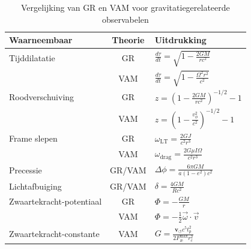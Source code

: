 \begin{table}[ht]
    \centering
    \caption{Vergelijking van GR en VAM voor gravitatiegerelateerde observabelen}
    \label{tab:VAM-GR}
    \begin{tabular}{|l|c|l|}
        \hline
        \textbf{Waarneembaar} & \textbf{Theorie} & \textbf{Uitdrukking} \\
        \hline
        Tijddilatatie & GR & $  \frac{d\tau}{dt} = \sqrt{1 - \frac{2GM}{rc^2}} $ \\
        & VAM & $  \frac{d\tau}{dt} = \sqrt{1 - \frac{\Omega^2 r^2}{c^2}} $ \\
        \hline
        Roodverschuiving & GR & $  z = \left(1 - \frac{2GM}{rc^2} \right)^{-1/2} - 1 $ \\
        & VAM & $  z = \left(1 - \frac{v_\phi^2}{c^2} \right)^{-1/2} - 1 $ \\
        \hline
        Frame slepen & GR & $  \omega_\text{LT} = \frac{2GJ}{c^2 r^3} $ \\
        & VAM & $  \omega_\text{drag} = \frac{2G \mu I \Omega}{c^2 r^3} $ \\
        \hline
        Precessie & GR/VAM & $  \Delta\phi = \frac{6\pi GM}{a(1 - e^2)c^2} $ \\
        \hline
        Lichtafbuiging & GR/VAM & $  \delta = \frac{4GM}{Rc^2} $ \\
        \hline
        Zwaartekracht-potentiaal & GR & $  \Phi = -\frac{GM}{r} $ \\
        & VAM & $  \Phi = -\frac{1}{2} \vec{\omega} \cdot \vec{v} $ \\
        \hline
        Zwaartekracht-constante & VAM & $  G = \frac{\mathbf{v}_{\scriptscriptstyle\boldsymbol{\circlearrowleft}} c^5 t_p^2}{2 F^{\text{max}}_{\text{\ae}} r_c^2} $ \\
        \hline
    \end{tabular}
\end{table}